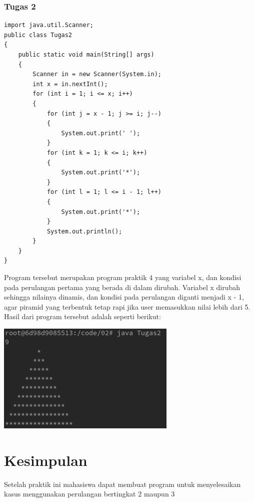 \documentclass[a4paper,12pt]{article}
\begin{document}
\subsubsection{Tugas 2}
\begin{center}
    \begin{lstlisting}
import java.util.Scanner;
public class Tugas2
{
    public static void main(String[] args)
    {
        Scanner in = new Scanner(System.in);
        int x = in.nextInt();
        for (int i = 1; i <= x; i++)
        {
            for (int j = x - 1; j >= i; j--)
            {
                System.out.print(' ');
            }
            for (int k = 1; k <= i; k++)
            {
                System.out.print('*');
            }
            for (int l = 1; l <= i - 1; l++)
            {
                System.out.print('*');
            }
            System.out.println();
        }
    }
}
    \end{lstlisting}
\end{center}
Program tersebut merupakan program praktik 4 yang variabel x, dan kondisi pada perulangan pertama yang berada di dalam dirubah. Variabel x dirubah sehingga 
nilainya dinamis, dan kondisi pada perulangan diganti menjadi x - 1, agar piramid yang terbentuk tetap rapi jika user memasukkan nilai lebih dari 5. 
Hasil dari program tersebut adalah seperti berikut:\\
\begin{center}
    \includegraphics[scale=.7]{tugas2.png} 
\end{center}

\newpage
\section{Kesimpulan}
Setelah praktik ini mahasiswa dapat membuat program untuk menyelesaikan kasus menggunakan
perulangan bertingkat 2 maupun 3
\end{document}
